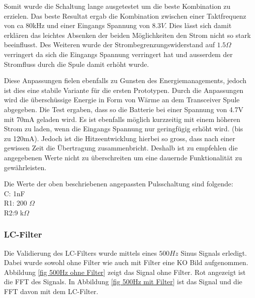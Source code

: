 Somit wurde die Schaltung lange ausgetestet um die beste Kombination zu erzielen. Das beste Resultat ergab die Kombination zwischen einer Taktfrequenz von ca 80kHz und einer Eingangs Spannung von $8.3V$. Dies lässt sich damit erklären das leichtes Absenken der beiden Möglichkeiten den Strom nicht so stark beeinflusst. Des Weiteren wurde der Strombegrenzungswiderstand auf $1.5\Omega$ verringert da sich die Eingangs Spannung verringert hat und ausserdem der Stromfluss durch die Spule damit erhöht wurde. 

Diese Anpassungen fielen ebenfalls zu Gunsten des Energiemanagements, jedoch ist dies eine stabile Variante für die ersten Prototypen. Durch die Anpassungen wird die überschüssige Energie in Form von Wärme an dem Transceiver Spule abgegeben. Die Test ergaben, dass so die Batterie bei einer Spannung von 4.7V mit 70mA geladen wird. Es ist ebenfalls möglich kurzzeitig mit einem höheren Strom zu laden, wenn die Eingangs Spannung nur geringfügig erhöht wird. (bis zu 120mA). Jedoch ist die Hitzeentwicklung hierbei so gross, dass nach einer gewissen Zeit die Übertragung zusammenbricht. Deshalb ist zu empfehlen die angegebenen Werte nicht zu überschreiten um eine dauernde Funktionalität zu gewährleisten.

Die Werte der oben beschriebenen angepassten Pulsschaltung sind folgende:\\
C: 1nF\\
R1: 200 $\Omega$\\
R2:9 k$\Omega$\\


\subsubsection*{LC-Filter} \label{sec:Validierung LC-Filter}
Die Validierung des LC-Filters wurde mittels eines $500Hz$ Sinus Signals erledigt. Dabei wurde sowohl ohne Filter wie auch mit Filter eine KO Bild aufgenommen. Abbildung \ref{fig 500Hz ohne Filter} zeigt das Signal ohne Filter. Rot angezeigt ist die FFT des Signals. In Abbildung \ref{fig 500Hz mit Filter} ist das Signal und die FFT davon mit dem LC-Filter. 


